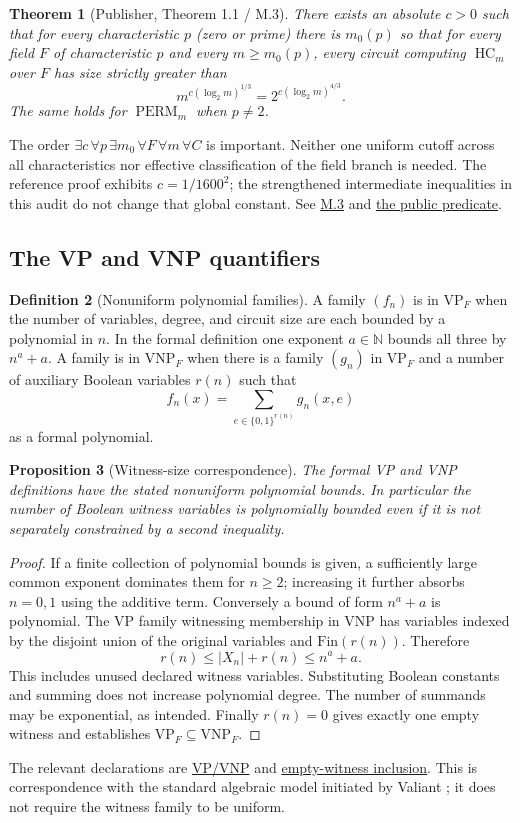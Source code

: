 \documentclass[11pt,letterpaper]{article}
\newtheorem{theorem}{Theorem}[section]
\newtheorem{proposition}[theorem]{Proposition}
\theoremstyle{definition}\newtheorem{definition}[theorem]{Definition}\newtheorem{example}[theorem]{Example}
\theoremstyle{remark}\newtheorem{remark}[theorem]{Remark}
\newcommand{\HC}{\operatorname{HC}}
\newcommand{\Perm}{\operatorname{PERM}}
\newcommand{\VP}{\mathrm{VP}}
\newcommand{\VNP}{\mathrm{VNP}}
\newcommand{\N}{\mathbb{N}}
\newcommand{\pub}[3]{\href{https://github.com/anthropics/formal-math/blob/11b6c7e3c927df2658f513b6b68ea7f8929c62c5/vp-vnp/#1\#L#2}{#3}}
\begin{document}
\begin{theorem}[Publisher, Theorem 1.1 / M.3]\label{thm:main}
There exists an absolute $c>0$ such that for every characteristic $p$ (zero or prime) there is $m_0(p)$ so that for every field $F$ of characteristic $p$ and every $m\ge m_0(p)$, every circuit computing $\HC_m$ over $F$ has size strictly greater than
\[
 m^{c(\log_2 m)^{1/3}}=2^{c(\log_2m)^{4/3}}.
\]
The same holds for $\Perm_m$ when $p\ne2$.
\end{theorem}
The order $\exists c\,\forall p\,\exists m_0\,\forall F\,\forall m\,\forall C$ is important. Neither one uniform cutoff across all characteristics nor effective classification of the field branch is needed. The reference proof exhibits $c=1/1600^2$; the strengthened intermediate inequalities in this audit do not change that global constant. See \pub{Paper/Fields.lean}{80}{M.3} and \pub{Statement.lean}{41}{the public predicate}.

\subsection{The VP and VNP quantifiers}
\begin{definition}[Nonuniform polynomial families]
A family $(f_n)$ is in $\VP_F$ when the number of variables, degree, and circuit size are each bounded by a polynomial in $n$. In the formal definition one exponent $a\in\N$ bounds all three by $n^a+a$. A family is in $\VNP_F$ when there is a family $(g_n)$ in $\VP_F$ and a number of auxiliary Boolean variables $r(n)$ such that
\[
 f_n(x)=\sum_{e\in\{0,1\}^{r(n)}} g_n(x,e)
\]
as a formal polynomial.
\end{definition}
\begin{proposition}[Witness-size correspondence]\label{prop:witness}
The formal VP and VNP definitions have the stated nonuniform polynomial bounds. In particular the number of Boolean witness variables is polynomially bounded even if it is not separately constrained by a second inequality.
\end{proposition}
\begin{proof}
If a finite collection of polynomial bounds is given, a sufficiently large common exponent dominates them for $n\ge2$; increasing it further absorbs $n=0,1$ using the additive term. Conversely a bound of form $n^a+a$ is polynomial. The VP family witnessing membership in VNP has variables indexed by the disjoint union of the original variables and $\mathrm{Fin}(r(n))$. Therefore
\[
 r(n)\le |X_n|+r(n)\le n^a+a.
\]
This includes unused declared witness variables. Substituting Boolean constants and summing does not increase polynomial degree. The number of summands may be exponential, as intended. Finally $r(n)=0$ gives exactly one empty witness and establishes $\VP_F\subseteq\VNP_F$.
\end{proof}
The relevant declarations are \pub{Statement.lean}{75}{VP/VNP} and \pub{Paper/Rate.lean}{491}{empty-witness inclusion}. This is correspondence with the standard algebraic model initiated by Valiant \cite{valiant}; it does not require the witness family to be uniform.
\end{document}
